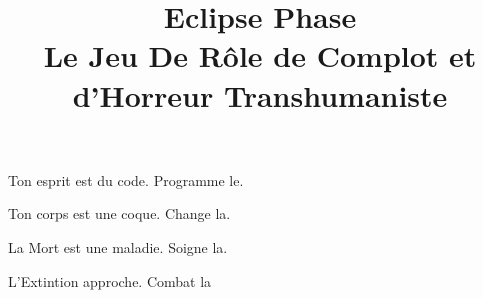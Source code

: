 \documentclass{book}
\begin{document}
 

\title{Eclipse Phase\\ Le Jeu De Rôle de Complot et d'Horreur Transhumaniste} \date{} 

\maketitle



\begin{frontmatter} 

\begin{center} Ton esprit est du code. Programme le. 

Ton corps est une coque. Change la. 

La Mort est une maladie. Soigne la. 

L'Extintion approche. Combat la \end{center} 

\newpage



 

\tableofcontents



\end{frontmatter} 

\begin{mainmatter} 














 

\end{mainmatter} 
\end{document}

